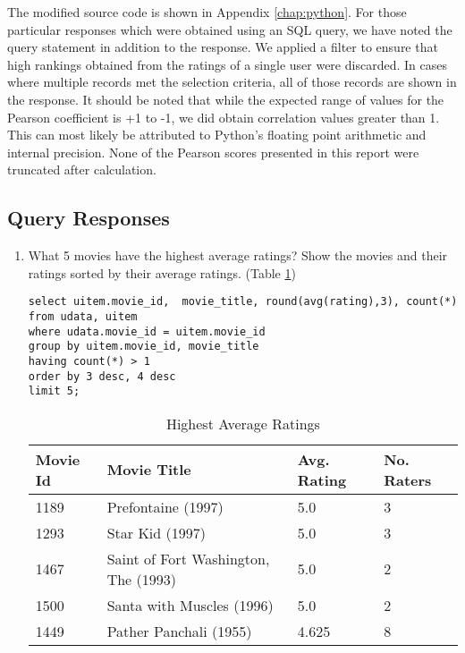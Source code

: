 \documentclass[letterpaper,11pt]{report}
\begin{document}
\begin{savenotes}
\indent{}The modified source code is shown in Appendix \ref{chap:python}. For those particular responses which were obtained using an SQL query, we have noted the query statement in addition to the response. We applied a filter to ensure that high rankings obtained from the ratings of a single user were discarded. In cases where multiple records met the selection criteria, all of those records are shown in the response. It should be noted that while the expected range of values for the Pearson coefficient is +1 to -1, we did obtain correlation values greater than 1. This can most likely be attributed to Python's floating point arithmetic and internal precision. None of the Pearson scores presented in this report were truncated after calculation.

\subsection{Query Responses}
\begin{enumerate}

\item What 5 movies have the highest average ratings? Show the movies and their ratings sorted by their average ratings. (Table \ref{tab:HighestRatings})
\begin{verbatim}
select uitem.movie_id,  movie_title, round(avg(rating),3), count(*) 
from udata, uitem 
where udata.movie_id = uitem.movie_id 
group by uitem.movie_id, movie_title 
having count(*) > 1 
order by 3 desc, 4 desc 
limit 5;
\end{verbatim}

\begin{table}[htbp]
\centering
    \begin{tabular}{|l|l|l|l|}
		    \hline
    Movie Id & Movie Title                          & Avg. Rating & No. Raters \\ \hline
    1189     & Prefontaine (1997)                   & 5.0         & 3          \\ \hline
    1293     & Star Kid (1997)                      & 5.0         & 3          \\ \hline
    1467     & Saint of Fort Washington, The (1993) & 5.0         & 2          \\ \hline
    1500     & Santa with Muscles (1996)            & 5.0         & 2          \\ \hline
    1449     & Pather Panchali (1955)               & 4.625       & 8          \\ \hline
    \end{tabular}
    \caption {Highest Average Ratings}
			\label{tab:HighestRatings}
\end{table}


\end{enumerate}
\end{savenotes}
\end{document}
